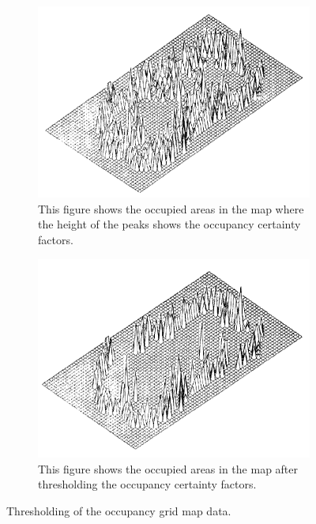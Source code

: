 \begin{figure}[h]
	\centering
	\begin{subfigure}[t]{0.4\linewidth}
		\includegraphics[width=\linewidth]{Figures/Occupancy_Grid_Map/Occupied_Areas_in_Map}
		\caption{This figure shows the occupied areas in the map where the height of the peaks shows the occupancy certainty factors.\cite{moravec1985high}}
		\label{fig:OGMwothresh}
	\end{subfigure} \hspace{0.1\textwidth}
	\begin{subfigure}[t]{0.4\linewidth}
		\includegraphics[width=\linewidth]{Figures/Occupancy_Grid_Map/Occupied_Areas_in_Map_after_Thresholding}
		\caption{This figure shows the occupied areas in the map after thresholding the occupancy certainty factors.\cite{moravec1985high}}
		\label{fig:OGMwthresh}
	\end{subfigure}
	\caption{Thresholding of the occupancy grid map data.}
	\label{fig:OGMw-wothresh}
\end{figure}


